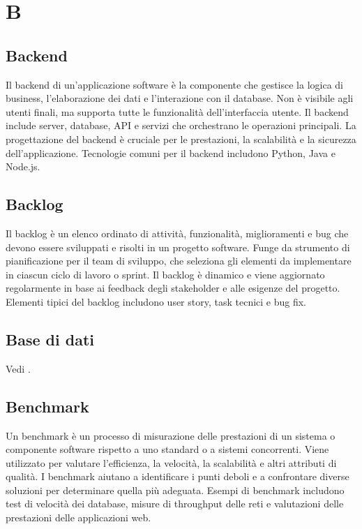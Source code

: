 \section{B}

\vspace{2em}
\subsection*{Backend}
\par Il backend di un'applicazione software è la componente che gestisce la logica di business, l'elaborazione dei dati e l'interazione con il database. Non è visibile agli utenti finali, ma supporta tutte le funzionalità dell'interfaccia utente. Il backend include server, database, API e servizi che orchestrano le operazioni principali. La progettazione del backend è cruciale per le prestazioni, la scalabilità e la sicurezza dell'applicazione. Tecnologie comuni per il backend includono Python, Java e Node.js.

\vspace{2em}
\subsection*{Backlog}
\par Il backlog è un elenco ordinato di attività, funzionalità, miglioramenti e bug che devono essere sviluppati e risolti in un progetto software. Funge da strumento di pianificazione per il team di sviluppo, che seleziona gli elementi da implementare in ciascun ciclo di lavoro o sprint. Il backlog è dinamico e viene aggiornato regolarmente in base ai feedback degli stakeholder e alle esigenze del progetto. Elementi tipici del backlog includono user story, task tecnici e bug fix.

\vspace{2em}
\subsection*{Base di dati}
\par Vedi .

\vspace{2em}
\subsection*{Benchmark}
\par Un benchmark è un processo di misurazione delle prestazioni di un sistema o componente software rispetto a uno standard o a sistemi concorrenti. Viene utilizzato per valutare l'efficienza, la velocità, la scalabilità e altri attributi di qualità. I benchmark aiutano a identificare i punti deboli e a confrontare diverse soluzioni per determinare quella più adeguata. Esempi di benchmark includono test di velocità dei database, misure di throughput delle reti e valutazioni delle prestazioni delle applicazioni web.

